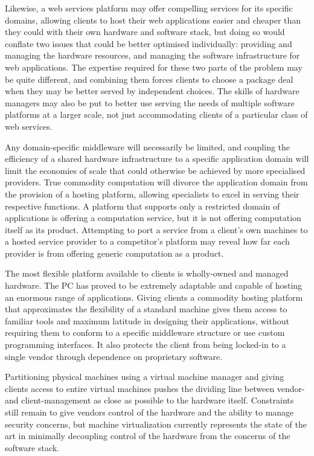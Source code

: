 Likewise, a web services platform may offer compelling services for its specific domains, allowing clients to host their web applications easier and cheaper than they could with their own hardware and software stack, but doing so would conflate two issues that could be better optimised individually: providing and managing the hardware resources, and managing the software infrastructure for web applications. The expertise required for these two parts of the problem may be quite different, and combining them forces clients to choose a package deal when they may be better served by independent choices. The skills of hardware managers may also be put to better use serving the needs of multiple software platforms at a larger scale, not just accommodating clients of a particular class of web services.

Any domain-specific middleware will necessarily be limited, and coupling the efficiency of a shared hardware infrastructure to a specific application domain will limit the economies of scale that could otherwise be achieved by more specialised providers. True commodity computation will divorce the application domain from the provision of a hosting platform, allowing specialists to excel in serving their respective functions. A platform that supports only a restricted domain of applications is offering a computation service, but it is not offering computation itself as its product. Attempting to port a service from a client's own machines to a hosted service provider to a competitor's platform may reveal how far each provider is from offering generic computation as a product.

The most flexible platform available to clients is wholly-owned and managed hardware. The PC has proved to be extremely adaptable and capable of hosting an enormous range of applications. Giving clients a commodity hosting platform that approximates the flexibility of a standard machine gives them access to familiar tools and maximum latitude in designing their applications, without requiring them to conform to a specific middleware structure or use custom programming interfaces. It also protects the client from being locked-in to a single vendor through dependence on proprietary software.

Partitioning physical machines using a virtual machine manager and giving clients access to entire virtual machines pushes the dividing line between vendor- and client-management as close as possible to the hardware itself. Constraints still remain to give vendors control of the hardware and the ability to manage security concerns, but machine virtualization currently represents the state of the art in minimally decoupling control of the hardware from the concerns of the software stack.

